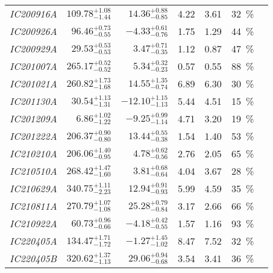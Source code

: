 \begin{table*}
\begin{tabular}{l r r r r c c}
        \emph{IC200916A} & $109.78^{+1.08}_{-1.44}$ & $14.36^{+0.88}_{-0.85}$ & 4.22 & 3.61 & \SI{32}{\percent}&\cite{IC200916A1, IC200916A2, IC200916A3}\\
        \emph{IC200926A} & $96.46^{+0.73}_{-0.55}$ & $-4.33^{+0.61}_{-0.76}$ & 1.75 & 1.29 & \SI{44}{\percent}&\cite{IC200926A1, IC200926A2}\\
        \emph{IC200929A} & $29.53^{+0.53}_{-0.53}$ & $3.47^{+0.71}_{-0.35}$ & 1.12 & 0.87 & \SI{47}{\percent}&\cite{IC200929A1, IC200929A2}\\
        \emph{IC201007A} & $265.17^{+0.52}_{-0.52}$ & $5.34^{+0.32}_{-0.23}$ & 0.57 & 0.55 & \SI{88}{\percent}&\cite{IC201007A1, IC201007A2}\\
        \emph{IC201021A} & $260.82^{+1.73}_{-1.68}$ & $14.55^{+1.35}_{-0.74}$ & 6.89 & 6.30 & \SI{30}{\percent}&\cite{IC201021A1, IC201021A2}\\
        \emph{IC201130A} & $30.54^{+1.13}_{-1.31}$ & $-12.10^{+1.15}_{-1.13}$ & 5.44 & 4.51 & \SI{15}{\percent}&\cite{IC201130A1, IC201130A2}\\
        \emph{IC201209A} & $6.86^{+1.02}_{-1.22}$ & $-9.25^{+0.99}_{-1.14}$ & 4.71 & 3.20 & \SI{19}{\percent}&\cite{IC201209A1, IC201209A2}\\
        \emph{IC201222A} & $206.37^{+0.90}_{-0.80}$ & $13.44^{+0.55}_{-0.38}$ & 1.54 & 1.40 & \SI{53}{\percent}&\cite{IC201222A1, IC201222A2}\\
        \emph{IC210210A} & $206.06^{+1.40}_{-0.95}$ & $4.78^{+0.62}_{-0.56}$ & 2.76 & 2.05 & \SI{65}{\percent}&\cite{IC210210A1, IC210210A2}\\
        \emph{IC210510A} & $268.42^{+1.47}_{-1.60}$ & $3.81^{+0.68}_{-0.64}$ & 4.04 & 3.67 & \SI{28}{\percent}&\cite{IC210510A1, IC210510A2}\\
        \emph{IC210629A} & $340.75^{+1.11}_{-2.23}$ & $12.94^{+0.91}_{-0.93}$ & 5.99 & 4.59 & \SI{35}{\percent}&\cite{IC210629A1, IC210629A2, IC210629A3}\\
        \emph{IC210811A} & $270.79^{+1.07}_{-1.08}$ & $25.28^{+0.79}_{-0.84}$ & 3.17 & 2.66 & \SI{66}{\percent}&\cite{IC210811A1, IC210811A2}\\
        \emph{IC210922A} & $60.73^{+0.96}_{-0.66}$ & $-4.18^{+0.42}_{-0.55}$ & 1.57 & 1.16 & \SI{93}{\percent}&\cite{IC210922A1, IC210922A2}\\
        \emph{IC220405A} & $134.47^{+1.71}_{-1.72}$ & $-1.27^{+1.45}_{-1.02}$ & 8.47 & 7.52 & \SI{32}{\percent}&\cite{IC220405A1, IC220405A2}\\
        \emph{IC220405B} & $320.62^{+1.37}_{-1.13}$ & $29.06^{+0.94}_{-0.68}$ & 3.54 & 3.41 & \SI{36}{\percent}&\cite{IC220405B1, IC220405A2}\\

\end{tabular}
\end{table*}
